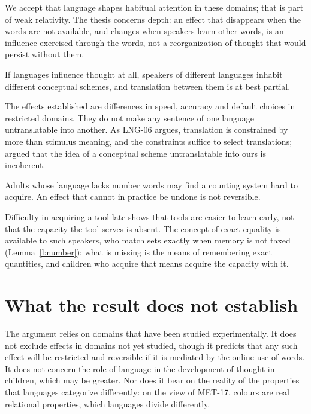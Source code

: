 \documentclass{situationist-preprint}
\begin{document}
\begin{reply}
We accept that language shapes habitual attention in these domains; that is part of weak relativity. The thesis concerns depth: an effect that disappears when the words are not available, and changes when speakers learn other words, is an influence exercised through the words, not a reorganization of thought that would persist without them.
\end{reply}

\begin{objection}\label{o:schemes}
If languages influence thought at all, speakers of different languages inhabit different conceptual schemes, and translation between them is at best partial.
\end{objection}

\begin{reply}
The effects established are differences in speed, accuracy and default choices in restricted domains. They do not make any sentence of one language untranslatable into another. As LNG-06 argues, translation is constrained by more than stimulus meaning, and the constraints suffice to select translations; \citet{Davidson1974} argued that the idea of a conceptual scheme untranslatable into ours is incoherent.
\end{reply}

\begin{objection}\label{o:late}
Adults whose language lacks number words may find a counting system hard to acquire. An effect that cannot in practice be undone is not reversible.
\end{objection}

\begin{reply}
Difficulty in acquiring a tool late shows that tools are easier to learn early, not that the capacity the tool serves is absent. The concept of exact equality is available to such speakers, who match sets exactly when memory is not taxed (Lemma~\ref{l:number}); what is missing is the means of remembering exact quantities, and children who acquire that means acquire the capacity with it.
\end{reply}

\section{What the result does not establish}

The argument relies on domains that have been studied experimentally. It does not exclude effects in domains not yet studied, though it predicts that any such effect will be restricted and reversible if it is mediated by the online use of words. It does not concern the role of language in the development of thought in children, which may be greater. Nor does it bear on the reality of the properties that languages categorize differently: on the view of MET-17, colours are real relational properties, which languages divide differently.
\end{document}
